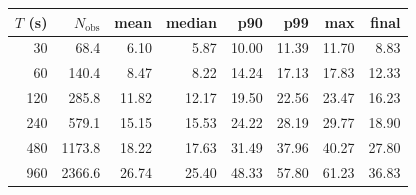 \begin{tabular}{rrrrrrrr}
\hline
$T$ (s) & $N_{\mathrm{obs}}$ & mean & median & p90 & p99 & max & final \\
\hline
30 & 68.4 & 6.10 & 5.87 & 10.00 & 11.39 & 11.70 & 8.83 \\
60 & 140.4 & 8.47 & 8.22 & 14.24 & 17.13 & 17.83 & 12.33 \\
120 & 285.8 & 11.82 & 12.17 & 19.50 & 22.56 & 23.47 & 16.23 \\
240 & 579.1 & 15.15 & 15.53 & 24.22 & 28.19 & 29.77 & 18.90 \\
480 & 1173.8 & 18.22 & 17.63 & 31.49 & 37.96 & 40.27 & 27.80 \\
960 & 2366.6 & 26.74 & 25.40 & 48.33 & 57.80 & 61.23 & 36.83 \\
\hline
\end{tabular}

